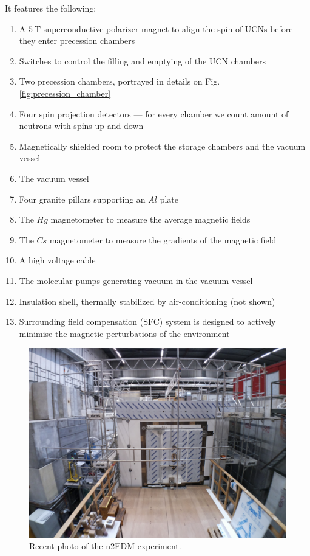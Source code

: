 It features \cite{Abel2018} the following:
\begin{enumerate}
	\item A $5\ \text{T}$ superconductive polarizer magnet to align the spin of UCNs before they enter precession chambers
	\item Switches to control the filling and emptying of the UCN chambers
	\item Two precession chambers, portrayed in details on Fig. \ref{fig:precession_chamber}
	\item Four spin projection detectors --- for every chamber we count amount of neutrons with spins up and down
	\item Magnetically shielded room to protect the storage chambers and the vacuum vessel
	\item The vacuum vessel
	\item Four granite pillars supporting an $Al$ plate
	\item The $Hg$ magnetometer to measure the average magnetic fields
	\item The $Cs$ magnetometer to measure the gradients of the magnetic field
	\item A high voltage cable
	\item The molecular pumps generating vacuum in the vacuum vessel
	\item Insulation shell, thermally stabilized by air-conditioning (not shown)
	\item Surrounding field compensation (SFC) system is designed to actively minimise the magnetic perturbations of the environment
\end{enumerate}

\begin{figure}[h]
	\centering
	\includegraphics[width=.79\textwidth]{img/n2edm_photo}
	\caption{Recent photo of the n2EDM experiment.}
	\label{fig:n2edm_photo}
\end{figure}%